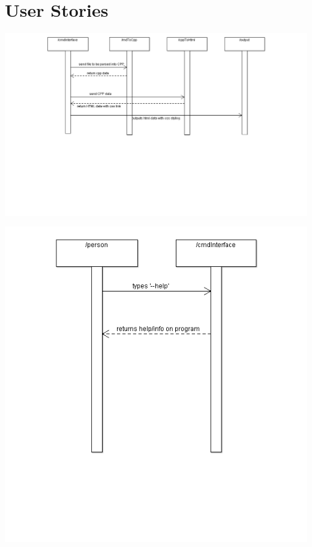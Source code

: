 \section{User Stories}

\hspace{-5cm}\includegraphics[width=700pt]{images/Output.png}

\hspace{-2cm}\includegraphics[width=450pt]{images/GettingHelp.png}

